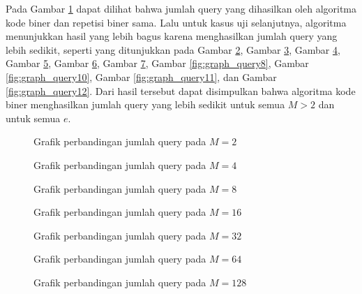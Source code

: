 Pada Gambar \ref{fig:graph_query1} dapat dilihat bahwa jumlah query yang dihasilkan oleh algoritma kode biner dan repetisi biner sama. Lalu untuk kasus uji selanjutnya, algoritma menunjukkan hasil yang lebih bagus karena menghasilkan jumlah query yang lebih sedikit, seperti yang ditunjukkan pada Gambar \ref{fig:graph_query2}, Gambar \ref{fig:graph_query3}, Gambar \ref{fig:graph_query4}, Gambar \ref{fig:graph_query5}, Gambar \ref{fig:graph_query6}, Gambar \ref{fig:graph_query7}, Gambar \ref{fig:graph_query8}, Gambar \ref{fig:graph_query10}, Gambar \ref{fig:graph_query11}, dan Gambar \ref{fig:graph_query12}. Dari hasil tersebut dapat disimpulkan bahwa algoritma kode biner menghasilkan jumlah query yang lebih sedikit untuk semua $M > 2$ dan untuk semua $e$.

\begin{figure}
\centering
{}
\caption{Grafik perbandingan jumlah query pada $M=2$}
\label{fig:graph_query1}
\end{figure}

\begin{figure}
\centering
{}
\caption{Grafik perbandingan jumlah query pada $M=4$}
\label{fig:graph_query2}
\end{figure}

\begin{figure}
\centering
{}
\caption{Grafik perbandingan jumlah query pada $M=8$}
\label{fig:graph_query3}
\end{figure}

\begin{figure}
\centering
{}
\caption{Grafik perbandingan jumlah query pada $M=16$}
\label{fig:graph_query4}
\end{figure}

\begin{figure}
\centering
{}
\caption{Grafik perbandingan jumlah query pada $M=32$}
\label{fig:graph_query5}
\end{figure}

\begin{figure}
\centering
{}
\caption{Grafik perbandingan jumlah query pada $M=64$}
\label{fig:graph_query6}
\end{figure}

\begin{figure}
\centering
{}
\caption{Grafik perbandingan jumlah query pada $M=128$}
\label{fig:graph_query7}
\end{figure}

